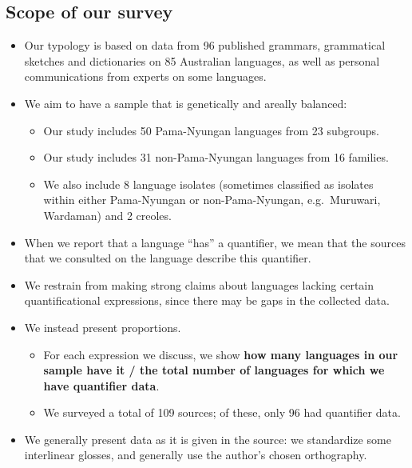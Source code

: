 \documentclass{article}
\begin{document}
\subsection{Scope of our survey}
\begin{itemize}
\item Our typology is based on data from 96 published grammars, grammatical sketches and dictionaries on 85 Australian languages, as well as personal communications from experts on some languages.
  
\item We aim to have a sample that is genetically and areally balanced:
  \begin{itemize}
  \item Our study includes 50 Pama-Nyungan languages from 23 subgroups.
  \item Our study includes 31 non-Pama-Nyungan languages from 16 families.
  \item We also include 8 language isolates (sometimes classified as isolates within either Pama-Nyungan or non-Pama-Nyungan, e.g.\ Muruwari, Wardaman) and 2 creoles.
  \end{itemize}
\item When we report that a language ``has'' a quantifier, we mean that the sources that we consulted on the language describe this quantifier.
\item We restrain from making strong claims about languages lacking certain quantificational expressions, since there may be gaps in the collected data.
\item We instead present proportions. 
  \begin{itemize}
  \item For each expression we discuss, we show \textbf{how many languages in our sample have it / the total number of languages for which we have quantifier data}.
  \item We surveyed a total of 109 sources; of these, only 96 had quantifier data.
  \end{itemize}
\item We generally present data as it is given in the source: we standardize some interlinear glosses, and generally use the author's chosen orthography.
\end{itemize}
\end{document}
